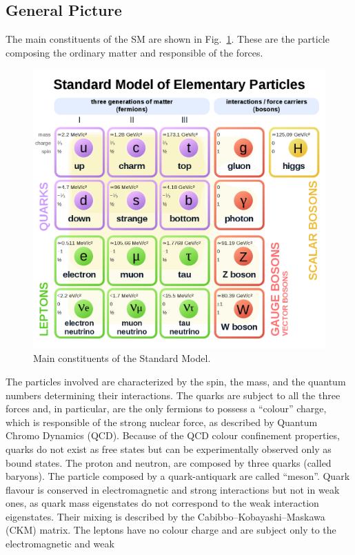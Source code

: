 \subsection*{General Picture}
The main constituents of the SM are shown in Fig.~\ref{SM}. These  are the particle  composing the ordinary matter and responsible of the forces.
\begin{figure}
\centering
\includegraphics[scale= 0.25]{../Cap1/SM}
\caption{Main constituents of the Standard Model.}
\label{SM}
\end{figure}
The particles involved are characterized by the spin, the mass, and the quantum numbers determining their interactions.
The quarks are subject to all the three forces and, in particular, are the only fermions to
possess a ``colour'' charge, which is responsible of the strong nuclear force, as described by Quantum Chromo Dynamics (QCD). Because of the QCD colour confinement properties, quarks do not exist as free states
but can be experimentally observed only as bound states. The proton and neutron, are composed by three quarks (called baryons). The particle composed by a quark-antiquark are called ``meson''. Quark flavour is conserved in electromagnetic and strong interactions but not in weak ones, as quark mass eigenstates do not correspond to the weak interaction eigenstates.
Their mixing is described by the Cabibbo–Kobayashi–Maskawa (CKM) matrix.
The leptons have no colour charge and are subject only to the electromagnetic and weak
